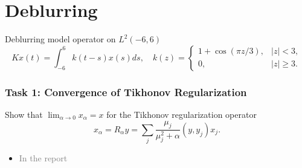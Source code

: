 \section{Deblurring}%
\label{sec:deblurring}

\begin{frame}
    \begin{problem}
     Deblurring model operator on $L^2(-6, 6)$
    \[
        Kx(t) = \int_{-6}^6 k(t-s)x(s)ds, \quad k(z) = \begin{cases}
        1 + \cos(\pi z/3), & |z| < 3, \\
        0, & |z| \geq 3.
        \end{cases}
    \]
    \end{problem}
\end{frame}

\begin{frame}
    \frametitle{Task 1: Convergence of Tikhonov Regularization}
    \begin{task}
        Show that $\lim_{\alpha \to 0} x_\alpha = x$ for the Tikhonov regularization operator
        \[
            x_\alpha = R_\alpha y = \sum_j \frac{\mu_j}{\mu_j^2 + \alpha} (y, y_j)x_j.
        \]
    \end{task}

    \begin{itemize}
        \item<2> \textcolor{gray}{In the report}
    \end{itemize}
\end{frame}

